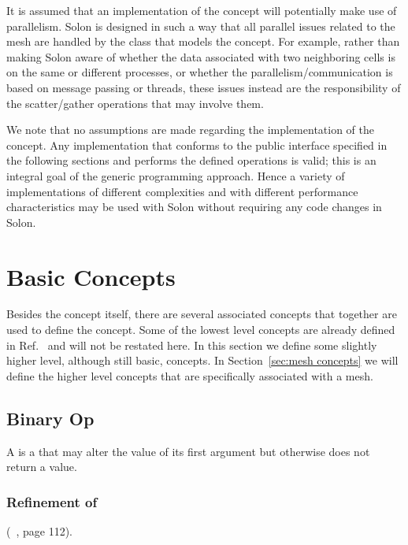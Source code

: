 \documentclass[11pt]{rnote}
\begin{document}
It is assumed that an implementation of the  concept will potentially make use of
parallelism. Solon is designed in such a way that all parallel issues
related to the mesh are handled by the class that models the
 concept. For example,
rather than making Solon aware of whether the data associated with two 
neighboring cells is on the same or different processes, or whether
the parallelism/communication is based on message passing or threads,
these issues instead are the responsibility of the scatter/gather
operations that may involve them.

We note that no assumptions are made regarding the implementation of
the  concept. Any
implementation that conforms to the public interface specified in the
following sections and performs the defined operations is valid; this
is an integral goal of the generic programming approach. Hence a
variety of implementations of different complexities and with
different performance characteristics may be used with Solon without
requiring any code changes in Solon.

\section{Basic Concepts}
\label{sec:basic concepts}

Besides the  concept
itself, there are several associated concepts that together are used
to define the 
concept. Some of the lowest level concepts are already defined in
Ref.~\cite{au99} and will not be restated here. In this section we
define some slightly higher level, although still basic, concepts. In
Section~\ref{sec:mesh concepts} we will define the higher level
concepts that are specifically associated with a mesh.

\subsection{Binary Op}

A  is a  that may alter
the value of its first argument but otherwise does not return a
value.

\subsubsection{Refinement of}
 (~\cite{au99}, page 112).
\end{document}
